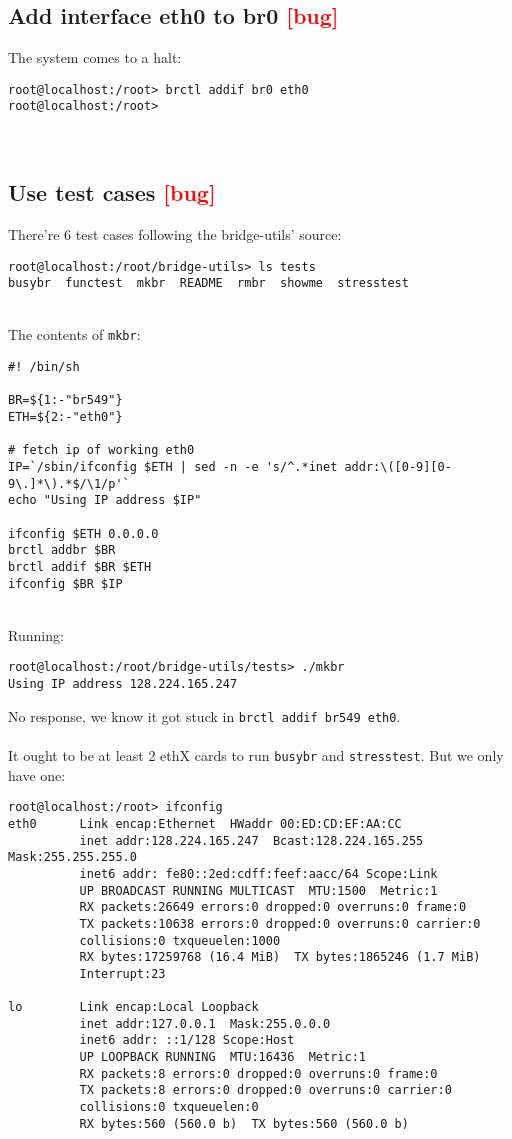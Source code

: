 \documentclass[a4paper]{report}
\begin{document}
\subsection{Add interface eth0 to br0 \textcolor{red}{[bug]}}
The system comes to a halt: 
\begin{lstlisting}
root@localhost:/root> brctl addif br0 eth0
root@localhost:/root>
\end{lstlisting}\null\\
\subsection{Use test cases \textcolor{red}{[bug]}}
There're 6 test cases following the bridge-utils' source:
\begin{lstlisting}
root@localhost:/root/bridge-utils> ls tests
busybr  functest  mkbr  README  rmbr  showme  stresstest
\end{lstlisting}\null\\
The contents of {\tt mkbr}:
\begin{lstlisting}
#! /bin/sh

BR=${1:-"br549"}
ETH=${2:-"eth0"}

# fetch ip of working eth0
IP=`/sbin/ifconfig $ETH | sed -n -e 's/^.*inet addr:\([0-9][0-9\.]*\).*$/\1/p'`
echo "Using IP address $IP"

ifconfig $ETH 0.0.0.0
brctl addbr $BR
brctl addif $BR $ETH
ifconfig $BR $IP
\end{lstlisting}\null\\
Running:
\begin{lstlisting}
root@localhost:/root/bridge-utils/tests> ./mkbr
Using IP address 128.224.165.247
\end{lstlisting}
No response, we know it got stuck in {\tt brctl addif br549 eth0}.\\\\
It ought to be at least 2 ethX cards to run {\tt busybr} and {\tt stresstest}.
But we only have one:
\begin{lstlisting}
root@localhost:/root> ifconfig
eth0      Link encap:Ethernet  HWaddr 00:ED:CD:EF:AA:CC  
          inet addr:128.224.165.247  Bcast:128.224.165.255  Mask:255.255.255.0
          inet6 addr: fe80::2ed:cdff:feef:aacc/64 Scope:Link
          UP BROADCAST RUNNING MULTICAST  MTU:1500  Metric:1
          RX packets:26649 errors:0 dropped:0 overruns:0 frame:0
          TX packets:10638 errors:0 dropped:0 overruns:0 carrier:0
          collisions:0 txqueuelen:1000 
          RX bytes:17259768 (16.4 MiB)  TX bytes:1865246 (1.7 MiB)
          Interrupt:23 

lo        Link encap:Local Loopback  
          inet addr:127.0.0.1  Mask:255.0.0.0
          inet6 addr: ::1/128 Scope:Host
          UP LOOPBACK RUNNING  MTU:16436  Metric:1
          RX packets:8 errors:0 dropped:0 overruns:0 frame:0
          TX packets:8 errors:0 dropped:0 overruns:0 carrier:0
          collisions:0 txqueuelen:0 
          RX bytes:560 (560.0 b)  TX bytes:560 (560.0 b)
\end{lstlisting}\null\\
\end{document}
